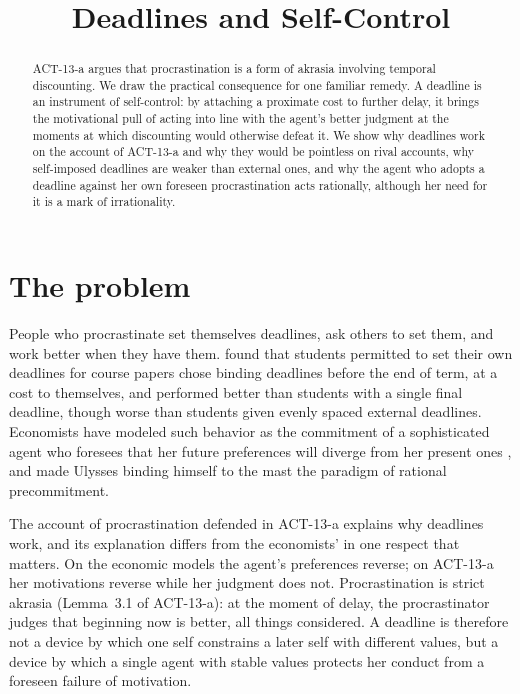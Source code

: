 \documentclass{situationist-preprint}
\title{Deadlines and Self-Control}
\begin{document}
\maketitle

\begin{abstract}
ACT-13-a argues that procrastination is a form of akrasia involving temporal discounting. We draw the practical consequence for one familiar remedy. A deadline is an instrument of self-control: by attaching a proximate cost to further delay, it brings the motivational pull of acting into line with the agent's better judgment at the moments at which discounting would otherwise defeat it. We show why deadlines work on the account of ACT-13-a and why they would be pointless on rival accounts, why self-imposed deadlines are weaker than external ones, and why the agent who adopts a deadline against her own foreseen procrastination acts rationally, although her need for it is a mark of irrationality.
\end{abstract}

\section{The problem}

People who procrastinate set themselves deadlines, ask others to set them, and work better when they have them. \citet{Ariely2002} found that students permitted to set their own deadlines for course papers chose binding deadlines before the end of term, at a cost to themselves, and performed better than students with a single final deadline, though worse than students given evenly spaced external deadlines. Economists have modeled such behavior as the commitment of a sophisticated agent who foresees that her future preferences will diverge from her present ones \citep{Strotz1955,ODonoghueRabin1999}, and \citet{Elster1979} made Ulysses binding himself to the mast the paradigm of rational precommitment.

The account of procrastination defended in ACT-13-a explains why deadlines work, and its explanation differs from the economists' in one respect that matters. On the economic models the agent's preferences reverse; on ACT-13-a her motivations reverse while her judgment does not. Procrastination is strict akrasia (Lemma~3.1 of ACT-13-a): at the moment of delay, the procrastinator judges that beginning now is better, all things considered. A deadline is therefore not a device by which one self constrains a later self with different values, but a device by which a single agent with stable values protects her conduct from a foreseen failure of motivation.
\end{document}
